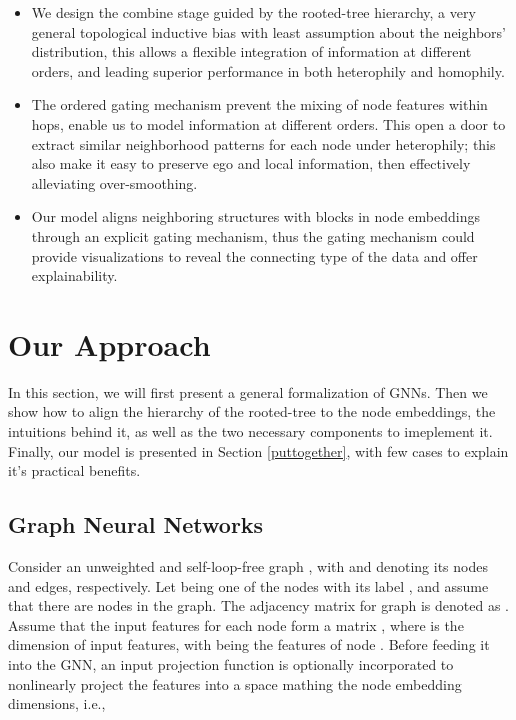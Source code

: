 \documentclass{article}
\begin{document}
\begin{itemize}
\item We design the combine stage guided by the rooted-tree hierarchy, a very general topological inductive bias with least assumption about the neighbors' distribution, this allows a flexible integration of information at different orders, and leading superior performance in both heterophily and homophily.


\item The ordered gating mechanism prevent the mixing of node features within hops, enable us to model information at different orders. This open a door to extract similar neighborhood patterns for each node under heterophily; this also make it easy to preserve ego and local information, then effectively alleviating over-smoothing.


\item Our model aligns neighboring structures with blocks in node embeddings through an explicit gating mechanism, thus the gating mechanism could provide visualizations to reveal the connecting type of the data and offer explainability.
\end{itemize}


\section{Our Approach}
In this section, we will first present a general formalization of GNNs. Then we show how to align the hierarchy of the rooted-tree to the node embeddings, the intuitions behind it, as well as the two necessary components to imeplement it. Finally, our model is presented in Section \ref{puttogether}, with few cases to explain it's practical benefits.

\subsection{Graph Neural Networks}
Consider an unweighted and self-loop-free graph , with  and  denoting its nodes and edges, respectively. Let  being one of the nodes with its label , and assume that there are  nodes in the graph. The adjacency matrix for graph  is denoted as .
Assume that the input features for each node form a matrix , where  is the dimension of input features, with  being the features of node . Before feeding it into the GNN, an input projection function  is optionally incorporated to nonlinearly project the features into a space mathing the node embedding dimensions, i.e., 
\end{document}
